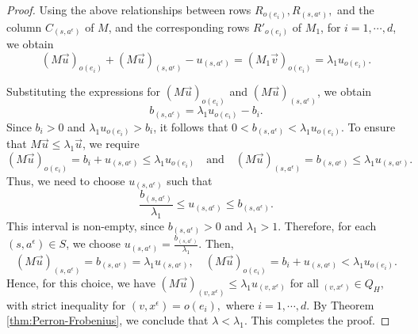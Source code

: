 \documentclass[10pt,a4paper]{amsart}
\newcommand{\e}{\epsilon}
\begin{document}
\begin{proof}
    Using the above relationships between rows $R_{o(e_i)}, R_{(s,a^{\e})},$ and the column $C_{(s,a^{\e})}$ of $M$, and the corresponding rows $R'_{o(e_i)}$ of $M_1$, for $i = 1,\cdots,d$, we obtain
    $$(M \overrightarrow{u})_{o(e_i)} + (M \overrightarrow{u})_{(s,a^{\e})} - u_{(s,a^{\e})} = (M_1 \overrightarrow{v})_{o(e_i)} = \lambda_1 u_{o(e_i)}.$$

    Substituting the expressions for $(M \overrightarrow{u})_{o(e_i)}$ and $(M \overrightarrow{u})_{(s,a^{\e})}$, we obtain
    $$b_{(s,a^{\e})} = \lambda_1 u_{o(e_i)} - b_i.$$
    Since $b_i > 0$ and $\lambda_1 u_{o(e_i)} > b_i$, it follows that $0 < b_{(s,a^{\e})} < \lambda_1 u_{o(e_i)}.$
    To ensure that $M \overrightarrow{u} \leq \lambda_1 \overrightarrow{u}$, we require
    $$(M \overrightarrow{u})_{o(e_i)} = b_i + u_{(s,a^{\e})} \leq \lambda_1 u_{o(e_i)} \quad \text{and} \quad (M \overrightarrow{u})_{(s,a^{\e})} = b_{(s,a^{\e})} \leq \lambda_1 u_{(s,a^{\e})}.$$
    Thus, we need to choose $u_{(s,a^{\e})}$ such that $$\frac{b_{(s,a^{\e})}}{\lambda_1} \leq u_{(s,a^{\e})} \leq b_{(s,a^{\e})}.$$
    This interval is non-empty, since $b_{(s,a^{\e})} > 0$ and $\lambda_1 > 1$. Therefore, for each $(s,a^{\e}) \in S$, we choose 
    $u_{(s,a^{\e})} = \frac{b_{(s,a^{\e})}}{\lambda_1}$. Then, 
    $$(M \overrightarrow{u})_{(s,a^{\e})} = b_{(s,a^{\e})} = \lambda_1 u_{(s,a^{\e})}, \quad (M \overrightarrow{u})_{o(e_i)} = b_i + u_{(s,a^{\e})} < \lambda_1 u_{o(e_i)}.$$
    Hence, for this choice, we have $(M \overrightarrow{u})_{(v, x^{\e})} \leq \lambda_1 u_{(v, x^{\e})}$ for all $_{(v, x^{\e})} \in Q_H$, with strict inequality for $(v, x^{\e}) = o(e_i),$ where $ i = 1,\cdots, d$. 
    By Theorem \ref{thm:Perron-Frobenius}, we conclude that $\lambda < \lambda_1.$ This completes the proof.
\end{proof}
\end{document}
